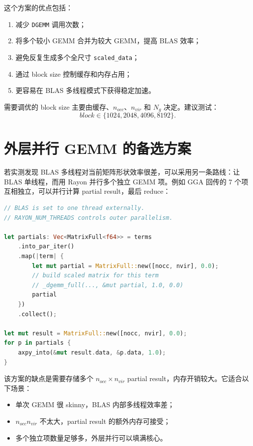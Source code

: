 \documentclass[11pt,a4paper]{ctexart}
\begin{document}
这个方案的优点包括：

\begin{enumerate}[leftmargin=2em]
  \item 减少 \texttt{DGEMM} 调用次数；
  \item 将多个较小 GEMM 合并为较大 GEMM，提高 BLAS 效率；
  \item 避免反复生成多个全尺寸 \texttt{scaled\_data}；
  \item 通过 block size 控制缓存和内存占用；
  \item 更容易在 BLAS 多线程模式下获得稳定加速。
\end{enumerate}

需要调优的 block size 主要由缓存、$n_{occ}$、$n_{vir}$ 和 $N_g$ 决定。建议测试：
\begin{equation}
  block\in\{1024,2048,4096,8192\}.
\end{equation}

\section{外层并行 GEMM 的备选方案}

若实测发现 BLAS 多线程对当前矩阵形状效率很差，可以采用另一条路线：让 BLAS 单线程，而用 Rayon 并行多个独立 GEMM 项。例如 GGA 回传的 7 个项互相独立，可以并行计算 partial result，最后 reduce：

\begin{lstlisting}[language=Rust,style=code]
// BLAS is set to one thread externally.
// RAYON_NUM_THREADS controls outer parallelism.

let partials: Vec<MatrixFull<f64>> = terms
    .into_par_iter()
    .map(|term| {
        let mut partial = MatrixFull::new([nocc, nvir], 0.0);
        // build scaled matrix for this term
        // _dgemm_full(..., &mut partial, 1.0, 0.0)
        partial
    })
    .collect();

let mut result = MatrixFull::new([nocc, nvir], 0.0);
for p in partials {
    axpy_into(&mut result.data, &p.data, 1.0);
}
\end{lstlisting}

该方案的缺点是需要存储多个 $n_{occ}\times n_{vir}$ partial result，内存开销较大。它适合以下场景：

\begin{itemize}[leftmargin=2em]
  \item 单次 GEMM 很 skinny，BLAS 内部多线程效率差；
  \item $n_{occ}n_{vir}$ 不太大，partial result 的额外内存可接受；
  \item 多个独立项数量足够多，外层并行可以填满核心。
\end{itemize}
\end{document}
